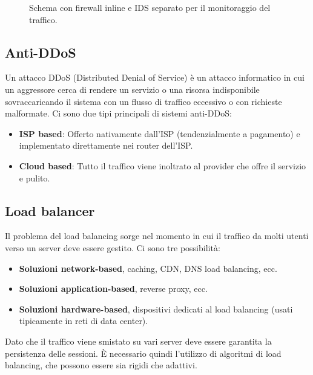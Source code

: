 \begin{figure}[H]
\centering
{}
\caption{Schema con firewall inline e IDS separato per il monitoraggio del traffico.}
\end{figure}
\subsection{Anti-DDoS}
Un attacco DDoS (Distributed Denial of Service) è un attacco informatico in cui un aggressore cerca di rendere un servizio o una risorsa indisponibile sovraccaricando il sistema con un flusso di traffico eccessivo o con richieste malformate.
Ci sono due tipi principali di sistemi anti-DDoS:
\begin{itemize}
	\item \textbf{ISP based}: Offerto nativamente dall'ISP (tendenzialmente a pagamento) e implementato direttamente nei router dell'ISP.
	\item \textbf{Cloud based}: Tutto il traffico viene inoltrato al provider che offre il servizio e pulito.
\end{itemize}
\subsection{Load balancer}
Il problema del load balancing sorge nel momento in cui il traffico da molti utenti verso un server deve essere gestito.
Ci sono tre possibilità:
\begin{itemize}
	\item \textbf{Soluzioni network-based}, caching, CDN, DNS load balancing, ecc.
	\item \textbf{Soluzioni application-based}, reverse proxy, ecc.
	\item \textbf{Soluzioni hardware-based}, dispositivi dedicati al load balancing (usati tipicamente in reti di data center).
\end{itemize}
Dato che il traffico viene smistato su vari server deve essere garantita la persistenza delle sessioni.
È necessario quindi l'utilizzo di algoritmi di load balancing, che possono essere sia rigidi che adattivi.
